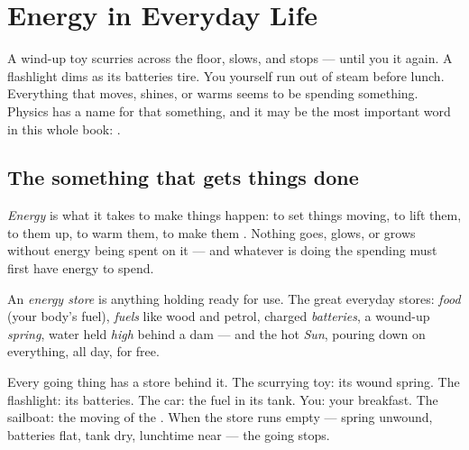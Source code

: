 \chapter{Energy in Everyday Life}\label{ch:g5:everyday-energy}

A wind-up toy scurries across the floor, slows, and stops --- until
you  it again. A flashlight dims as its batteries tire. You
yourself run out of steam before lunch. Everything that moves,
shines,  or warms seems to be spending something. Physics has
a name for that something, and it may be the most important word in
this whole book: .

\section{The something that gets things done}

\begin{definition}[Energy]\label{def:g5:everyday-energy:energy}
\emph{Energy} is what it takes to make things happen:
to set things moving, to lift them, to  them up, to warm them,
to make them . Nothing goes, glows, or grows without energy
being spent on it --- and whatever is doing the spending must first
have energy to spend.
\end{definition}

\begin{definition}\label{def:g5:everyday-energy:store}
An \emph{energy store} is anything holding
 ready for use. The great everyday stores: \emph{food} (your
body's fuel), \emph{fuels} like wood and petrol, charged
\emph{batteries}, a wound-up \emph{spring}, water held \emph{high}
behind a dam --- and the hot \emph{Sun}, pouring  down on
everything, all day, for free.
\end{definition}

\begin{example}\label{ex:g5:everyday-energy:spot}
Every going thing has a store behind it. The scurrying toy: its
wound spring. The flashlight: its batteries. The car: the fuel in
its tank. You: your breakfast. The sailboat: the moving  of the
. When the store runs empty --- spring unwound, batteries flat,
tank dry, lunchtime near --- the going stops.
\end{example}

